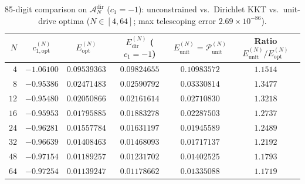 \documentclass[10pt,a4paper]{article}
\theoremstyle{definition}
\begin{document}
\begin{table}[ht]
\centering
\caption{85-digit comparison on $\mathcal{A}_N^{\mathrm{dir}}$ ($c_1 = -1$): unconstrained vs.\ Dirichlet KKT vs.\ unit-drive optima ($N \in [4,64]$; max telescoping error $2.69 \times 10^{-86}$).}
\label{tab:dirichlet_lab}
\vspace{4pt}
\small
\begin{tabular}{@{}rccccc@{}}
\toprule
$N$ & $c_{1,\mathrm{opt}}^{(N)}$ & $E_{\mathrm{opt}}^{(N)}$ & $E_{\mathrm{dir}}^{(N)}$ ($c_1=-1$) & $E_{\mathrm{unit}}^{(N)} = \mathcal{P}_{\mathrm{unit}}^{(N)}$ & Ratio $E_{\mathrm{unit}}^{(N)} / E_{\mathrm{opt}}^{(N)}$ \\
\midrule
$4$  & $-1.06100$ & $0.09539363$ & $0.09824655$ & $0.10983572$ & $1.1514$ \\
$8$  & $-0.95386$ & $0.02471483$ & $0.02590792$ & $0.03330814$ & $1.3477$ \\
$12$ & $-0.95480$ & $0.02050866$ & $0.02161614$ & $0.02710830$ & $1.3218$ \\
$16$ & $-0.95953$ & $0.01795885$ & $0.01883278$ & $0.02287503$ & $1.2737$ \\
$24$ & $-0.96281$ & $0.01557784$ & $0.01631197$ & $0.01945589$ & $1.2489$ \\
$32$ & $-0.96639$ & $0.01408463$ & $0.01468093$ & $0.01717137$ & $1.2192$ \\
$48$ & $-0.97154$ & $0.01189257$ & $0.01231702$ & $0.01402525$ & $1.1793$ \\
$64$ & $-0.97254$ & $0.01139247$ & $0.01178662$ & $0.01335088$ & $1.1719$ \\
\bottomrule
\end{tabular}
\end{table}
\end{document}
